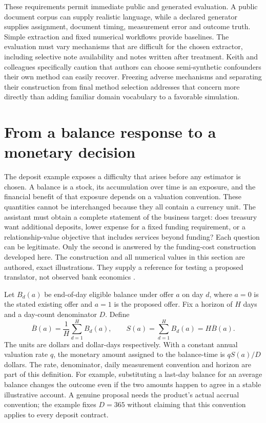 These requirements permit immediate public and generated evaluation. A
public document corpus can supply realistic language, while a declared
generator supplies assignment, document timing, measurement error and
outcome truth. Simple extraction and fixed numerical workflows provide
baselines. The evaluation must vary mechanisms that are difficult for
the chosen extractor, including selective note availability and notes
written after treatment. Keith and colleagues specifically caution that
authors can choose semi-synthetic confounders their own method can
easily recover. Freezing adverse mechanisms and separating their
construction from final method selection addresses that concern more
directly than adding familiar domain vocabulary to a favorable
simulation. \citep{exec13_census_text_review_arxiv}

\label{exec13:census-measurement-end}


\section{From a balance response to a monetary decision}
\label{exec17:l2-monetary}

The deposit example exposes a difficulty that arises before any estimator is
chosen. A balance is a stock, its accumulation over time is an exposure, and
the financial benefit of that exposure depends on a valuation convention.
These quantities cannot be interchanged because they all contain a currency
unit. The assistant must obtain a complete statement of the business target:
does treasury want additional deposits, lower expense for a fixed funding
requirement, or a relationship-value objective that includes services beyond
funding? Each question can be legitimate. Only the second is answered by the
funding-cost construction developed here. The construction and all numerical
values in this section are authored, exact illustrations. They supply a
reference for testing a proposed translator, not observed bank economics
\citep{exec17_l2_monetary_exact}.

Let $B_d(a)$ be end-of-day eligible balance under offer $a$ on day $d$, where
$a=0$ is the stated existing offer and $a=1$ is the proposed offer. Fix a
horizon of $H$ days and a day-count denominator $D$. Define
\begin{equation}
 \overline B(a)=\frac1H\sum_{d=1}^H B_d(a),\qquad
 S(a)=\sum_{d=1}^H B_d(a)=H\overline B(a).
 \label{exec17:l2-stock}
\end{equation}
The units are dollars and dollar-days respectively. With a constant annual
valuation rate $q$, the monetary amount assigned to the balance-time is
$qS(a)/D$ dollars. The rate, denominator, daily measurement convention and
horizon are part of this definition. For example, substituting a last-day
balance for an average balance changes the outcome even if the two amounts
happen to agree in a stable illustrative account. A genuine proposal needs
the product's actual accrual convention; the example fixes $D=365$ without
claiming that this convention applies to every deposit contract.

